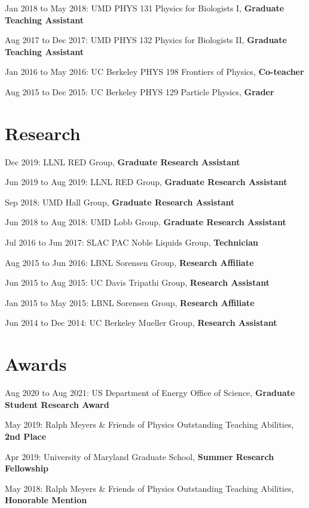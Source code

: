 \documentclass[
]{scrartcl}
\begin{document}
Jan 2018 to May 2018: UMD PHYS 131 Physics for Biologists I,
\textbf{Graduate Teaching Assistant}

Aug 2017 to Dec 2017: UMD PHYS 132 Physics for Biologists II,
\textbf{Graduate Teaching Assistant}

Jan 2016 to May 2016: UC Berkeley PHYS 198 Frontiers of Physics,
\textbf{Co-teacher}

Aug 2015 to Dec 2015: UC Berkeley PHYS 129 Particle Physics,
\textbf{Grader}

\hypertarget{fa-atom-research}{%
\section{\texorpdfstring{
Research}{ Research}}\label{fa-atom-research}}

Dec 2019: LLNL RED Group, \textbf{Graduate Research Assistant}

Jun 2019 to Aug 2019: LLNL RED Group, \textbf{Graduate Research
Assistant}

Sep 2018: UMD Hall Group, \textbf{Graduate Research Assistant}

Jun 2018 to Aug 2018: UMD Lobb Group, \textbf{Graduate Research
Assistant}

Jul 2016 to Jun 2017: SLAC PAC Noble Liquids Group, \textbf{Technician}

Aug 2015 to Jun 2016: LBNL Sorensen Group, \textbf{Research Affiliate}

Jun 2015 to Aug 2015: UC Davis Tripathi Group, \textbf{Research
Assistant}

Jan 2015 to May 2015: LBNL Sorensen Group, \textbf{Research Affiliate}

Jun 2014 to Dec 2014: UC Berkeley Mueller Group, \textbf{Research
Assistant}

\hypertarget{fa-trophy-awards}{%
\section{\texorpdfstring{
Awards}{ Awards}}\label{fa-trophy-awards}}

Aug 2020 to Aug 2021: US Department of Energy Office of Science,
\textbf{Graduate Student Research Award}

May 2019: Ralph Meyers \& Friends of Physics Outstanding Teaching
Abilities, \textbf{2nd Place}

Apr 2019: University of Maryland Graduate School, \textbf{Summer
Research Fellowship}

May 2018: Ralph Meyers \& Friends of Physics Outstanding Teaching
Abilities, \textbf{Honorable Mention}
\end{document}
